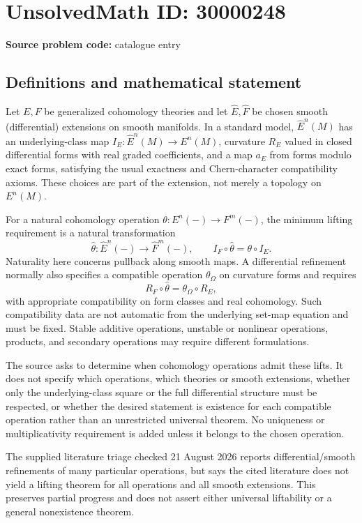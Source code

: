 \documentclass[11pt]{article}
\begin{document}
\section*{UnsolvedMath ID: 30000248}
\textbf{Source problem code:} catalogue entry
\subsection{Definitions and mathematical statement}
Let $E,F$ be generalized cohomology theories and let $\widehat E,\widehat F$ be chosen smooth (differential) extensions on smooth manifolds. In a standard model, $\widehat E^n(M)$ has an underlying-class map $I_E:\widehat E^n(M)\to E^n(M)$, curvature $R_E$ valued in closed differential forms with real graded coefficients, and a map $a_E$ from forms modulo exact forms, satisfying the usual exactness and Chern-character compatibility axioms. These choices are part of the extension, not merely a topology on $E^n(M)$.

For a natural cohomology operation $\theta:E^n(-)\to F^m(-)$, the minimum lifting requirement is a natural transformation
\[
 \widehat\theta:\widehat E^n(-)\longrightarrow\widehat F^m(-),
 \qquad I_F\circ\widehat\theta=\theta\circ I_E.
\]
Naturality here concerns pullback along smooth maps. A differential refinement normally also specifies a compatible operation $\theta_\Omega$ on curvature forms and requires
\[
 R_F\circ\widehat\theta=\theta_\Omega\circ R_E,
\]
with appropriate compatibility on form classes and real cohomology. Such compatibility data are not automatic from the underlying set-map equation and must be fixed. Stable additive operations, unstable or nonlinear operations, products, and secondary operations may require different formulations.

The source asks to determine when cohomology operations admit these lifts. It does not specify which operations, which theories or smooth extensions, whether only the underlying-class square or the full differential structure must be respected, or whether the desired statement is existence for each compatible operation rather than an unrestricted universal theorem. No uniqueness or multiplicativity requirement is added unless it belongs to the chosen operation.

The supplied literature triage checked 21 August 2026 reports differential/smooth refinements of many particular operations, but says the cited literature does not yield a lifting theorem for all operations and all smooth extensions. This preserves partial progress and does not assert either universal liftability or a general nonexistence theorem.
\end{document}
